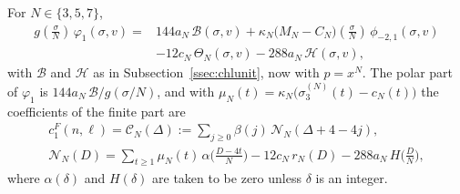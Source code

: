 \begin{proposition}\label{prop:chluniodd}
For $N\in\{3,5,7\}$,
\begin{equation}\label{eq:chlunioddclosed}
\begin{split}
g(\tfrac\sigma N)\,\varphi_1(\sigma,v)={}&144a_N\,\mathcal B(\sigma,v)+\kappa_N\big(M_N-C_N\big)(\tfrac\sigma N)\,\phi_{-2,1}(\sigma,v)\\
&-12c_N\,\Theta_N(\sigma,v)-288a_N\,\mathcal H(\sigma,v),
\end{split}
\end{equation}
with $\mathcal B$ and $\mathcal H$ as in Subsection~\ref{ssec:chlunit}, now with $p=x^N$. The polar part of $\varphi_1$ is $144a_N\,\mathcal B/g(\sigma/N)$, and with $\mu_N(t)=\kappa_N\big(\sigma_3^{(N)}(t)-c_N(t)\big)$ the coefficients of the finite part are
\begin{equation}\label{eq:chlunioddcoeff}
\begin{gathered}
c^F_1(n,\ell)=\mathcal C_N(\Delta):=\sum_{j\ge0}\beta(j)\,\mathcal N_N(\Delta+4-4j),\\
\mathcal N_N(D)=\sum_{t\ge1}\mu_N(t)\,\alpha\big(\tfrac{D-4t}N\big)-12c_N\,r_N(D)-288a_N\,H\big(\tfrac DN\big),
\end{gathered}
\end{equation}
where $\alpha(\delta)$ and $H(\delta)$ are taken to be zero unless $\delta$ is an integer.
\end{proposition}

